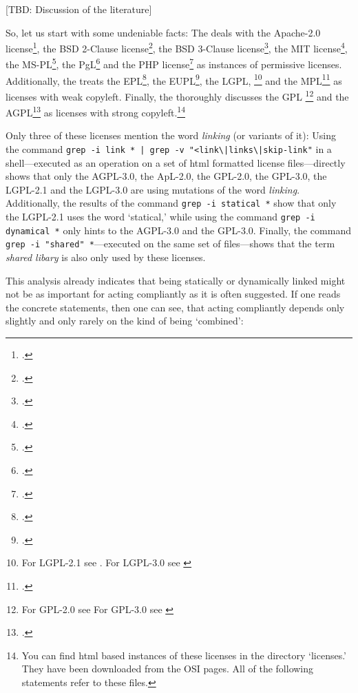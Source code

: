 [TBD: Discussion of the literature]

So, let us start with some undeniable facts: The \oslic{} deals with the Apache-2.0
license\footcite [cf.][\nopage wp]{Apl20OsiLicense2004a}, the BSD 2-Clause
license\footcite [cf.][\nopage wp]{BsdLicense2Clause}, the BSD 3-Clause
license\footcite [cf.][\nopage wp]{BsdLicense3Clause}, the MIT license\footcite
[cf.][\nopage wp]{MitLicense2012a}, the MS-PL\footcite[cf.][\nopage
wp]{MsplOsiLicense2013a}, the PgL\footcite[cf.][\nopage wp]{PglOsiLicense2013a}
and the PHP license\footcite[cf.][\nopage wp]{Php30OsiLicense2013a} as instances
of permissive licenses.
Additionally, the \oslic{} treats the EPL\footcite[cf.][\nopage
wp]{Epl10OsiLicense2005a}, the EUPL\footcite[cf.][\nopage
wp]{Eupl11OsiLicense2007a}, the LGPL,%
  \footnote{For LGPL-2.1 see \cite[cf.][\nopage wp]{Lgpl21OsiLicense1999a}. 
  For LGPL-3.0 see \cite [cf.][\nopage wp]{Lgpl30OsiLicense2007a} } 
and the MPL\footcite [cf.][\nopage
wp]{Mpl20OsiLicense2013a} as licenses with weak copyleft. Finally, the \oslic{}
thoroughly discusses the GPL%
  \footnote{For GPL-2.0 see \cite [cf.][\nopage wp]{Gpl20OsiLicense1991a} 
  For GPL-3.0 see \cite [cf.][\nopage wp]{Gpl30OsiLicense2007a} } 
and the AGPL\footcite[cf.][\nopage wp]{Agpl30OsiLicense2007a} 
as licenses with strong copyleft.\footnote{You can
find html based instances of these licenses in the \oslic{} directory `licenses.'
They have been downloaded from the OSI pages. All of the following statements
refer to these files.}

Only three of these licenses mention the word \emph{linking} (or variants of
it): Using the command \texttt{grep -i link * | grep -v
"<link\textbackslash{}|links\textbackslash{}|skip-link"} in a shell---executed
as an operation on a set of html formatted license files---directly shows that
only the AGPL-3.0, the ApL-2.0, the GPL-2.0, the GPL-3.0, the LGPL-2.1 and the
LGPL-3.0 are using mutations of the word \emph{linking}. Additionally, the
results of the command \texttt{grep -i statical *} show that only the LGPL-2.1
uses the word `statical,' while using the command \texttt{grep -i dynamical *}
only hints to the AGPL-3.0 and the GPL-3.0. Finally, the command \texttt{grep -i
"shared" *}---executed on the same set of files---shows that the term
\emph{shared libary} is also only used by these licenses.

This analysis already indicates that being statically or dynamically linked
might not be as important for acting compliantly as it is often suggested.
% 
If one reads the concrete statements, then one can see, that acting compliantly
depends only slightly and only rarely on the kind of being `combined':

